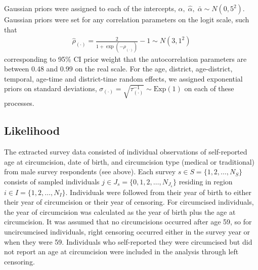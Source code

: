 \documentclass{article}
\begin{document}
\begin{appendix}
Gaussian priors were assigned to each of the intercepts, $\alpha, \;\hat{\alpha}, \;\bar{\alpha} \sim N(0, 5^2)$. Gaussian priors were set for any correlation parameters on the logit scale, such that 
\begin{align*} 
  \hat{\rho}_{(\cdot)} = \frac{2}{1 + \exp(-\rho_{(\cdot)})} - 1 \sim N(3, 1^2)
\end{align*}
corresponding to 95\% CI prior weight that the autocorrelation parameters are between 0.48 and 0.99 on the real scale. For the age, district, age-district, temporal, age-time and district-time random effects, we assigned exponential priors on standard deviations, $\sigma_{(\cdot)} = \sqrt{\tau^{-1}_{(\cdot)}} \sim \text{Exp}(1)$ on each of these processes.


\subsection{Likelihood}
\label{sec::likelihood}


The extracted survey data consisted of individual observations of self-reported age at circumcision, date of birth, and circumcision type (medical or traditional) from male survey respondents (see above). Each survey $s \in S = \{1, 2, \ldots, N_S\}$ consists of sampled individuals $j \in J_s = \{0, 1, 2, \ldots, N_{J_s}\}$ residing in region $i \in I = \{1, 2, \ldots, N_I\}$. Individuals were followed from their year of birth to either their year of circumcision or their year of censoring. For circumcised individuals, the year of circumcision was calculated as the year of birth plus the age at circumcision. It was assumed that no circumcisions occurred after age 59, so for uncircumcised individuals, right censoring occurred either in the survey year or when they were 59. Individuals who self-reported they were circumcised but did not report an age at circumcision were included in the analysis through left censoring. 


\end{appendix}
\end{document}
